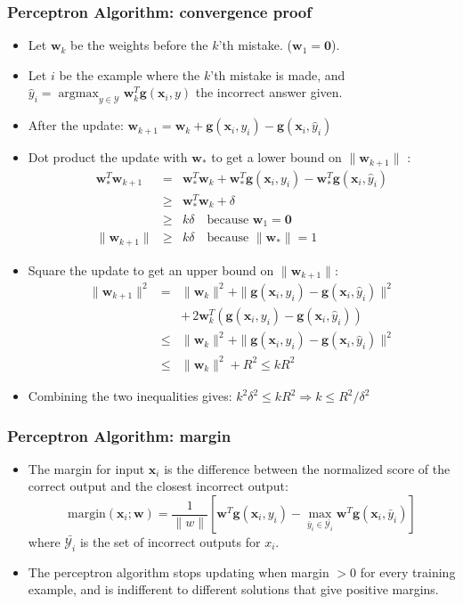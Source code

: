 \documentclass[ignorenonframetext,plain]{beamer}
\DeclareMathOperator*{\argmax}{argmax}
\renewcommand{\vec}{\mathbf}
\begin{document}
\begin{frame}\frametitle{Perceptron Algorithm: convergence proof}
\small
\begin{itemize}
\item Let $\vec{w}_k$ be the weights before the $k$'th mistake.
  ($\vec{w}_1 = \vec{0}$).
\item Let $i$ be the example where the $k$'th mistake is made, and
  $\hat{y}_i = \argmax_{y\in\mathcal{Y}} \vec{w}_k^T \vec{g}(\vec{x}_i,y)$
  the incorrect answer given.
\item After the update: $\vec{w}_{k+1} = \vec{w}_k + \vec{g}(\vec{x}_i,y_i) -
  \vec{g}(\vec{x}_i,\hat{y}_i)$
\item Dot product the update with $\vec{w}_*$ to get a lower bound on
  $\|\vec{w}_{k+1}\|$ :\begin{eqnarray*} 
\vec{w}_*^T \vec{w}_{k+1} &=& \vec{w}_*^T \vec{w}_k + \vec{w}_*^T
  \vec{g}(\vec{x}_i,y_i) - \vec{w}_*^T \vec{g}(\vec{x}_i,\hat{y}_i) \\
 &\geq& \vec{w}_*^T \vec{w}_k + \delta \\
 &\geq& k \delta 
  \quad\text{because } \vec{w}_1=\vec{0} \\
\|\vec{w}_{k+1}\| &\geq& k \delta 
  \quad\text{because } \|\vec{w}_*\|=1
\end{eqnarray*} 
\item Square the update to get an upper bound on
  $\|\vec{w}_{k+1}\|$: \begin{eqnarray*}
\|\vec{w}_{k+1}\|^2 &=& \|\vec{w}_k\|^2 + \|\vec{g}(\vec{x}_i,y_i) -
  \vec{g}(\vec{x}_i,\hat{y}_i)\|^2 \\
  && +\, 2 \vec{w}_k^T (\vec{g}(\vec{x}_i,y_i) -
  \vec{g}(\vec{x}_i,\hat{y}_i)) \\
&\leq& \|\vec{w}_k\|^2 + \|\vec{g}(\vec{x}_i,y_i) -
  \vec{g}(\vec{x}_i,\hat{y}_i)\|^2 \\
&\leq& \|\vec{w}_k\|^2 + R^2 \leq k R^2
\end{eqnarray*}
\item Combining the two inequalities gives: $ k^2 \delta^2 \leq k R^2
  \Rightarrow k \leq R^2 / \delta^2 $
\end{itemize}
\end{frame}

\begin{frame}\frametitle{Perceptron Algorithm: margin}
\begin{itemize}
\item The margin for input $\vec{x}_i$ is the difference between the
  normalized score of the correct output and the closest incorrect
  output:
\[
  \text{margin}(\vec{x}_i; \vec{w}) = \frac{1}{\|w\|}
  \left[ \vec{w}^T\vec{g}(\vec{x}_i,y_i) - \max_{\bar{y}_i \in 
    \bar{\mathcal{Y}_i}} \vec{w}^T\vec{g}(\vec{x}_i,\bar{y}_i) \right]
\]
where $\bar{\mathcal{Y}_i}$ is the set of incorrect outputs for $x_i$.
\item The perceptron algorithm stops updating when margin $> 0$ for
  every training example, and is indifferent to different solutions
  that give positive margins.
\end{itemize}
\end{frame}
\end{document}
